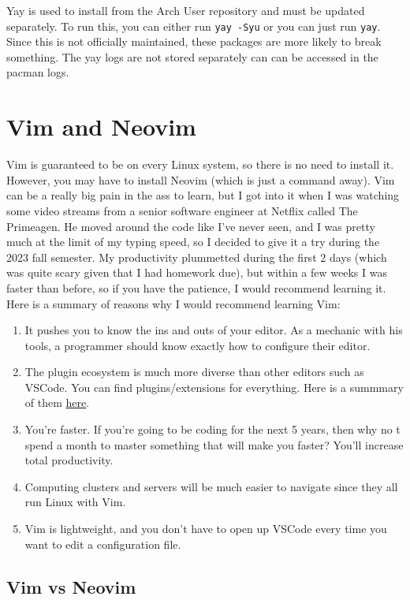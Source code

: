 \documentclass{article}
\begin{document}
    Yay is used to install from the Arch User repository and must be updated separately. To run this, you can either run \texttt{yay -Syu} or you can just run \texttt{yay}. Since this is not officially maintained, these packages are more likely to break something. The yay logs are not stored separately can can be accessed in the pacman logs. 


\section{Vim and Neovim}

  Vim is guaranteed to be on every Linux system, so there is no need to install it. However, you may have to install Neovim (which is just a command away). Vim can be a really big pain in the ass to learn, but I got into it when I was watching some video streams from a senior software engineer at Netflix called The Primeagen. He moved around the code like I've never seen, and I was pretty much at the limit of my typing speed, so I decided to give it a try during the 2023 fall semester. My productivity plummetted during the first 2 days (which was quite scary given that I had homework due), but within a few weeks I was faster than before, so if you have the patience, I would recommend learning it. Here is a summary of reasons why I would recommend learning Vim: 
  \begin{enumerate}
    \item It pushes you to know the ins and outs of your editor. As a mechanic with his tools, a programmer should know exactly how to configure their editor.  
    \item The plugin ecosystem is much more diverse than other editors such as VSCode. You can find plugins/extensions for everything. Here is a summmary of them \href{https://github.com/rockerBOO/awesome-neovim\#neovim-lua-development}{here}. 
    \item You're faster. If you're going to be coding for the next 5 years, then why no t spend a month to master something that will make you faster? You'll increase total productivity. 
    \item Computing clusters and servers will be much easier to navigate since they all run Linux with Vim. 
    \item Vim is lightweight, and you don't have to open up VSCode every time you want to edit a configuration file.  
  \end{enumerate}

  \subsection{Vim vs Neovim}
\end{document}
